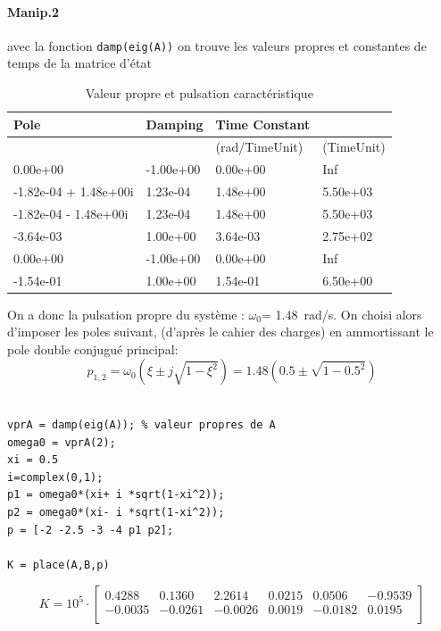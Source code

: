 \documentclass[10pt,a4paper,notitlepage]{article}
\begin{document}
\paragraph{Manip.2}
avec la fonction \texttt{damp(eig(A))} on trouve les valeurs propres et constantes de temps de la matrice d'état
\begin{table}[H]
  \centering
  \begin{tabular}[t]{llll}
  \hline
  {\bf Pole}                 & {\bf Damping}   & {\bf Time Constant}  &            \\
\hline
                       &           & {(rad/TimeUnit)} & {(TimeUnit)} \\   
  
  0.00e+00             & -1.00e+00 & 0.00e+00       & Inf        \\
 -1.82e-04 + 1.48e+00i & 1.23e-04  & 1.48e+00       & 5.50e+03   \\ 
 -1.82e-04 - 1.48e+00i & 1.23e-04  & 1.48e+00       & 5.50e+03   \\ 
 -3.64e-03             & 1.00e+00  & 3.64e-03       & 2.75e+02   \\ 
  0.00e+00             & -1.00e+00 & 0.00e+00       & Inf        \\
  -1.54e-01             & 1.00e+00  & 1.54e-01       & 6.50e+00   \\
  \hline
\end{tabular}

\caption{Valeur propre et pulsation caractéristique}
\end{table}
On a donc la pulsation propre du système : $\omega_0$= \SI{1.48}{rad/s}. On choisi alors d'imposer les poles suivant, (d'après le cahier des charges) en ammortissant le pole double conjugué principal:
\[
  p_{1,2} = \omega_0(\xi\pm j \sqrt{1-\xi^2}) = 1.48(0.5\pm \sqrt{1-0.5^2})
\]
\begin{verbatim}
  
vprA = damp(eig(A)); % valeur propres de A 
omega0 = vprA(2);
xi = 0.5
i=complex(0,1);
p1 = omega0*(xi+ i *sqrt(1-xi^2));
p2 = omega0*(xi- i *sqrt(1-xi^2));
p = [-2 -2.5 -3 -4 p1 p2];

K = place(A,B,p)

\end{verbatim}
\[K = 10^{5}\cdot
\begin{bmatrix}
  
    0.4288 & 0.1360  & 2.2614  & 0.0215 & 0.0506  & -0.9539 \\
   -0.0035 & -0.0261 & -0.0026 & 0.0019 & -0.0182 & 0.0195  \\

\end{bmatrix}\]
\end{document}
